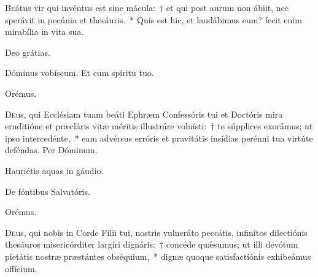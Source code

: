 




\lettrine{B}{e}átus vir qui invéntus est sine mácula:~† et qui post aurum non ábiit, nec sperávit in pecúnia et thesáuris.~* Quis est hic, et laudábimus eum? fecit enim mirabília in vita sua.

\rr Deo grátias.

\hymnus



   
      
   
   
      \vv Dóminus vobíscum. \rr Et cum spíritu tuo.
      
      Orémus.
      
      \lettrine{D}{e}us, qui Ecclésiam tuam beáti Ephræm Confessóris tui et Doctóris mira eruditióne et præcláris vitæ méritis illustráre voluísti:~† te súpplices exorámus; ut ipso intercedénte,~* eam advérsus erróris et pravitátis insídias perénni tua virtúte deféndas.
Per Dóminum.

 
 \vv Hauriétis aquas in gáudio.

\rr De fóntibus Salvatóris.

Orémus.

\lettrine{D}{e}us, qui nobis in Corde Fílii tui, nostris vulneráto peccátis, infinítos dilectiónis thesáuros misericórditer largíri dignáris:~† concéde quǽsumus; ut illi devótum pietátis nostræ præstántes obséquium,~* dignæ quoque satisfactiónis exhibeámus offícium.

